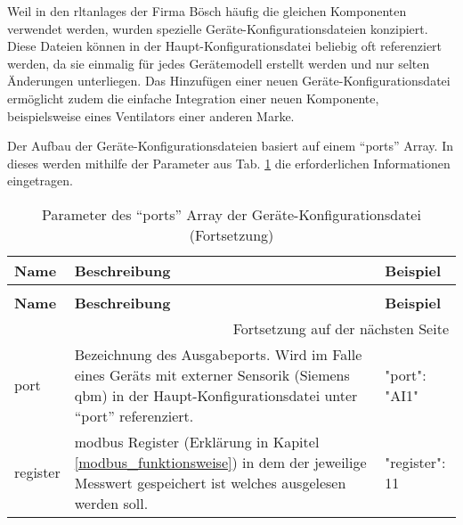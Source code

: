 \begin{enumerate}
	Weil in den \acsp{rltanlage} der Firma Bösch häufig die gleichen Komponenten verwendet werden, wurden spezielle Geräte-Konfigurationsdateien konzipiert. Diese Dateien können in der Haupt-Konfigurationsdatei beliebig oft referenziert werden, da sie einmalig für jedes Gerätemodell erstellt werden und nur selten Änderungen unterliegen. Das Hinzufügen einer neuen Geräte-Konfigurationsdatei ermöglicht zudem die einfache Integration einer neuen Komponente, beispielsweise eines Ventilators einer anderen Marke.
	
	Der Aufbau der Geräte-Konfigurationsdateien basiert auf einem \enquote{ports} Array. In dieses werden mithilfe der Parameter aus Tab. \ref{tab:ports_array_parameter} die erforderlichen Informationen eingetragen.
    
\begin{longtable}[h]{p{} p{} | p{}}
    \caption{Parameter des \enquote{ports} Array der Geräte-Konfigurationsdateien}
    \label{tab:ports_array_parameter}
    \\ \toprule
    \textbf{Name} & \textbf{Beschreibung} & \textbf{Beispiel}
    \\ \midrule
    \endfirsthead
    \caption{Parameter des \enquote{ports} Array der Geräte-Konfigurationsdatei (Fortsetzung)}
    \\ \toprule
    \textbf{Name} & \textbf{Beschreibung} & \textbf{Beispiel}
    \\ \midrule
    \endhead
    \midrule
    \multicolumn{3}{r}{{Fortsetzung auf der nächsten Seite}} 
    \\ \bottomrule
    \endfoot
    \bottomrule
    \endlastfoot
    port      	& Bezeichnung des Ausgabeports. Wird im Falle eines Geräts mit externer Sensorik (\zB Siemens \gls{qbm}) in der Haupt-Konfigurationsdatei unter \enquote{port} referenziert. & 
    \begin{jsonTable}
"port": "AI1"
    \end{jsonTable} 
    \\
    register 	& \gls{modbus} Register (Erklärung in Kapitel \ref{modbus_funktionsweise}) in dem der jeweilige Messwert gespeichert ist \bzw welches ausgelesen werden soll. %
    & 
    \begin{jsonTable}
"register": 11
    \end{jsonTable} 
    \\

\end{longtable}
\end{enumerate}

